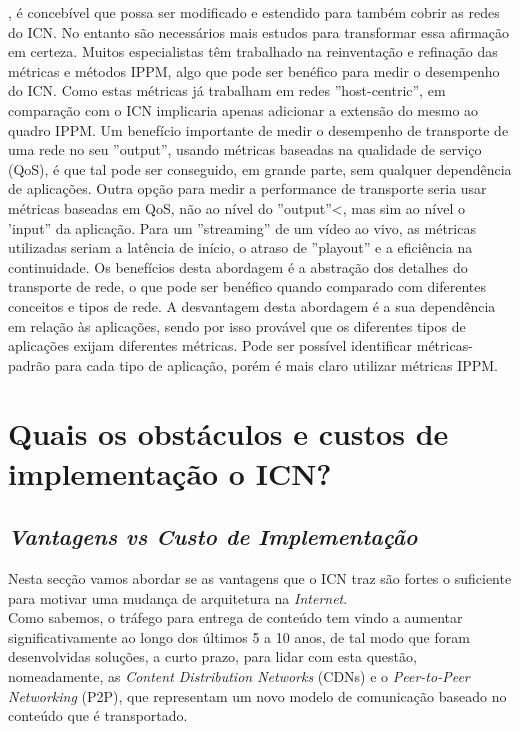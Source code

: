 \documentclass[conference]{IEEEtran}
\begin{document}
, \'{e} conceb\'{i}vel que possa ser modificado e estendido para tamb\'{e}m cobrir as redes do ICN. No entanto s\~{a}o necess\'{a}rios mais estudos para transformar essa afirma\c{c}\~{a}o em certeza. Muitos especialistas t\^{e}m trabalhado na reinventa\c{c}\~{a}o e refina\c{c}\~{a}o das m\'{e}tricas e m\'{e}todos IPPM, algo que pode ser ben\'{e}fico para medir o desempenho do ICN. Como estas m\'{e}tricas j\'{a} trabalham em redes ''host-centric'', em compara\c{c}\~{a}o com o ICN implicaria apenas adicionar a extens\~{a}o do mesmo ao quadro IPPM. Um benef\'{i}cio importante de medir o desempenho de transporte de uma rede no seu ''output'', usando m\'{e}tricas baseadas na qualidade de servi\c{c}o (QoS), \'{e} que tal pode ser conseguido, em grande parte, sem qualquer depend\^{e}ncia de aplica\c{c}\~{o}es. Outra op\c{c}\~{a}o para medir a performance de transporte seria usar m\'{e}tricas baseadas em QoS, n\~{a}o ao n\'{i}vel do ''output''<, mas sim ao n\'{i}vel o 'input'' da aplica\c{c}\~{a}o. Para um ''streaming'' de um v\'{i}deo ao vivo, as m\'{e}tricas utilizadas seriam a lat\^{e}ncia de in\'{i}cio, o atraso de ''playout'' e a efici\^{e}ncia na continuidade. Os benef\'{i}cios desta abordagem \'{e} a abstra\c{c}\~{a}o dos detalhes do transporte de rede, o que pode ser ben\'{e}fico quando comparado com diferentes conceitos e tipos de rede. A desvantagem desta abordagem \'{e} a sua depend\^{e}ncia em rela\c{c}\~{a}o \`{a}s aplica\c{c}\~{o}es, sendo por isso prov\'{a}vel que os diferentes tipos de aplica\c{c}\~{o}es exijam diferentes m\'{e}tricas. Pode ser poss\'{i}vel identificar m\'{e}tricas-padr\~{a}o para cada tipo de aplica\c{c}\~{a}o, por\'{e}m \'{e} mais claro utilizar m\'{e}tricas IPPM.

\section{Quais os obst\'{a}culos e custos de implementa\c{c}\~{a}o o ICN?}



\subsection{\textit{Vantagens vs Custo de Implementa\c{c}\~{a}o}}

Nesta sec\c{c}\~{a}o vamos abordar se as vantagens que o ICN traz s\~{a}o fortes o suficiente para motivar uma mudan\c{c}a de arquitetura na \textit{Internet}.\\

Como sabemos, o tr\'{a}fego para entrega de conte\'{u}do tem vindo a aumentar significativamente ao longo dos \'{u}ltimos 5 a 10 anos, de tal modo que foram desenvolvidas solu\c{c}\~{o}es, a curto prazo, para lidar com esta quest\~{a}o, nomeadamente, as \textit{Content Distribution Networks} (CDNs)\cite{cdn} e o \textit{Peer-to-Peer Networking} (P2P)\cite{p2p}, que representam um novo modelo de comunica\c{c}\~{a}o baseado no conte\'{u}do que \'{e} transportado.\\
\end{document}
